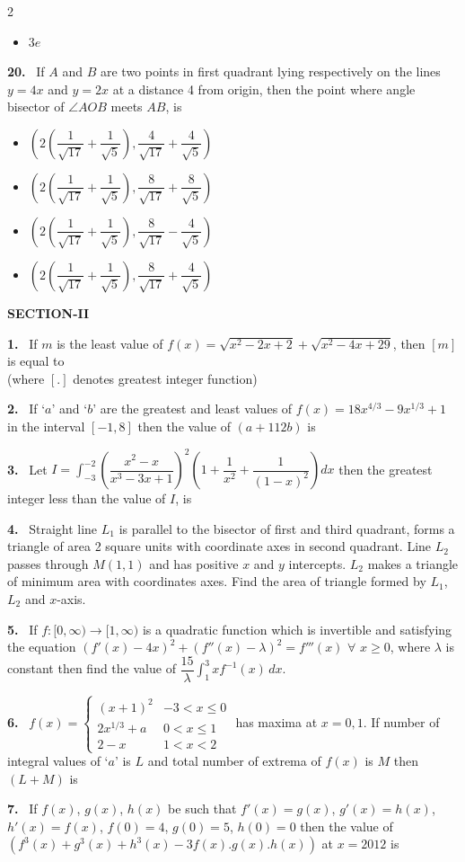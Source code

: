 \documentclass[10pt]{extarticle}
\newcommand{\sect}[1]{\par\smallskip\noindent\textbf{#1}\par}
\newcommand{\qn}[1]{\par\smallskip\noindent\textbf{#1.}~}
\newenvironment{qoptions}{\begin{itemize}[leftmargin=1.8em,itemsep=1pt,topsep=2pt,label={}]}{\end{itemize}}
\newcommand{\opt}[2]{\item[(#1)] #2}
\begin{document}
\begin{multicols}{2}
\begin{qoptions}
\opt{D}{$3e$}
\end{qoptions}
\qn{20} If $A$ and $B$ are two points in first quadrant lying respectively on the lines $y=4x$ and $y=2x$ at a distance 4 from origin, then the point where angle bisector of $\angle AOB$ meets $AB$, is
\begin{qoptions}
\opt{A}{$\left(2\left(\dfrac1{\sqrt{17}}+\dfrac1{\sqrt5}\right),\dfrac4{\sqrt{17}}+\dfrac4{\sqrt5}\right)$}
\opt{B}{$\left(2\left(\dfrac1{\sqrt{17}}+\dfrac1{\sqrt5}\right),\dfrac8{\sqrt{17}}+\dfrac8{\sqrt5}\right)$}
\opt{C}{$\left(2\left(\dfrac1{\sqrt{17}}+\dfrac1{\sqrt5}\right),\dfrac8{\sqrt{17}}-\dfrac4{\sqrt5}\right)$}
\opt{D}{$\left(2\left(\dfrac1{\sqrt{17}}+\dfrac1{\sqrt5}\right),\dfrac8{\sqrt{17}}+\dfrac4{\sqrt5}\right)$}
\end{qoptions}
\sect{SECTION-II}
\qn{1} If $m$ is the least value of $f(x)=\sqrt{x^2-2x+2}+\sqrt{x^2-4x+29}$, then $[m]$ is equal to\\
(where $[.]$ denotes greatest integer function)
\qn{2} If `$a$' and `$b$' are the greatest and least values of $f(x)=18x^{4/3}-9x^{1/3}+1$ in the interval $[-1,8]$ then the value of $(a+112b)$ is
\qn{3} Let {\small$I=\displaystyle\int_{-3}^{-2}\left(\dfrac{x^2-x}{x^3-3x+1}\right)^2\left(1+\dfrac1{x^2}+\dfrac1{(1-x)^2}\right)dx$} then the greatest integer less than the value of $I$, is
\qn{4} Straight line $L_1$ is parallel to the bisector of first and third quadrant, forms a triangle of area 2 square units with coordinate axes in second quadrant. Line $L_2$ passes through $M(1,1)$ and has positive $x$ and $y$ intercepts. $L_2$ makes a triangle of minimum area with coordinates axes. Find the area of triangle formed by $L_1$, $L_2$ and $x$-axis.
\qn{5} If $f:[0,\infty)\to[1,\infty)$ is a quadratic function which is invertible and satisfying the equation $\left(f'(x)-4x\right)^2+\left(f''(x)-\lambda\right)^2=f'''(x)$ $\forall$ $x\geq0$, where $\lambda$ is constant then find the value of $\dfrac{15}{\lambda}\displaystyle\int_1^3xf^{-1}(x)\,dx$.
\qn{6} $f(x)=\begin{cases}(x+1)^2&-3<x\leqslant0\\2x^{1/3}+a&0<x\leqslant1\\2-x&1<x<2\end{cases}$ has maxima at $x=0,1$. If number of integral values of `$a$' is $L$ and total number of extrema of $f(x)$ is $M$ then $(L+M)$ is
\qn{7} If $f(x)$, $g(x)$, $h(x)$ be such that $f'(x)=g(x)$, $g'(x)=h(x)$, $h'(x)=f(x)$, $f(0)=4$, $g(0)=5$, $h(0)=0$ then the value of $\left(f^3(x)+g^3(x)+h^3(x)-3f(x).g(x).h(x)\right)$ at $x=2012$ is

\end{multicols}
\end{document}
